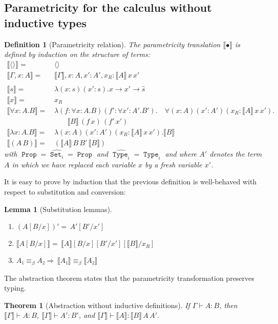\documentclass[a4paper,USenglish]{lipics}
\newtheorem{thm}{Theorem}
\newtheorem{dfn}{Definition}
\newtheorem{lem}{Lemma}
\DeclareMathOperator{\Prop}{\mathtt{Prop}}
\DeclareMathOperator{\Type}{\mathtt{Type}}
\DeclareMathOperator{\Set}{\mathtt{Set}}
\newcommand{\rel}[3]{{⟦#1⟧}\,{#2}\,{#3}}
\begin{document}
\subsection{Parametricity for the calculus without inductive types}
\setcounter{equation}{0} 

\begin{dfn}[\label{Parametricity}Parametricity relation]
The parametricity translation $⟦\bullet⟧$ is defined by induction on the
structure of terms:
\begin{align}
  ⟦\langle\rangle⟧ = &\,\langle \rangle \\
  ⟦Γ, x:A⟧ = &\,⟦Γ⟧, x:A, x':A',x_R :⟦A⟧\,x\,x' \\
  \nonumber\\
  ⟦s⟧ = &\,λ(x:s)(x':s).x → x' → \hat{s} \\
  ⟦x⟧ = &\,x_R \\
  \nonumber
  ⟦∀x\!:\! A.B⟧ = &\,λ(f:∀x:A.B)(f':∀x':A'.B').
  \quad ∀(x:A)(x':A')(x_R:\rel{A}{x}{x'}).\\
  & \qquad \rel{B}{(f\,x)}{(f'\,x')} \label{DefProd} \\
  ⟦λx:A.B⟧ = &\,λ(x:A)(x':A')(x_R:\rel{A}{x}{x'}).⟦B⟧ \\
  ⟦(A\,B)⟧ = &\,(⟦A⟧\,B\,B'\,⟦B⟧)
\end{align}
with $\hat{\Prop} = \hat{\Set_i} = \Prop$ and $\hat{\Type_i} = \Type_i$
and where $A'$ denotes the term $A$ in which we have replaced each variable
$x$ by a fresh variable $x'$.
\end{dfn}

It is easy to prove by induction that the previous definition is
well-behaved with respect to substitution and conversion:

\begin{lem}[Substitution lemmas]\label{substLemma}
\begin{enumerate}
\item $\left(A[B/x]\right)' = \,A'[B'/x']$
\item $⟦A[B/x]⟧ = \,⟦A⟧[B/x][B'/x']\left[⟦B⟧/x_R\right]$
\item $A₁ ≡_{\beta} A₂ ⇒ \,⟦A₁⟧ \equiv_{\beta} ⟦A₂⟧$
\end{enumerate}
\end{lem}

The abstraction theorem states that the parametricity transformation
preserves typing.

\begin{thm}[\label{Abstraction}Abstraction without inductive definitions]
If $Γ ⊢ A : B$, then $⟦Γ⟧ ⊢ A : B$, $⟦Γ⟧ ⊢ A' : B'$, and
    $⟦Γ⟧ ⊢ ⟦A⟧ : \rel{B}{A}{A'}$.
\end{thm}
\end{document}
